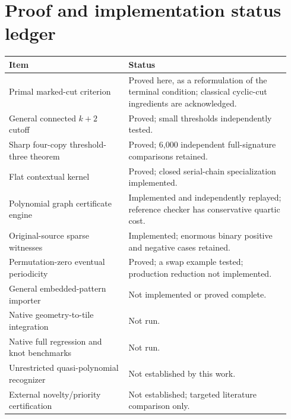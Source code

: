 \documentclass[11pt]{article}
\theoremstyle{remark}\newtheorem{remark}[theorem]{Remark}
\begin{document}
\section{Proof and implementation status ledger}
\begin{longtable}{>{\raggedright\arraybackslash}p{0.40\linewidth}>{\raggedright\arraybackslash}p{0.54\linewidth}}
\toprule
Item & Status\\\midrule\endhead
Primal marked-cut criterion & Proved here, as a reformulation of the terminal condition; classical cyclic-cut ingredients are acknowledged.\\
General connected $k+2$ cutoff & Proved; small thresholds independently tested.\\
Sharp four-copy threshold-three theorem & Proved; 6,000 independent full-signature comparisons retained.\\
Flat contextual kernel & Proved; closed serial-chain specialization implemented.\\
Polynomial graph certificate engine & Implemented and independently replayed; reference checker has conservative quartic cost.\\
Original-source sparse witnesses & Implemented; enormous binary positive and negative cases retained.\\
Permutation-zero eventual periodicity & Proved; a swap example tested; production reduction not implemented.\\
General embedded-pattern importer & Not implemented or proved complete.\\
Native geometry-to-tile integration & Not run.\\
Native full regression and knot benchmarks & Not run.\\
Unrestricted quasi-polynomial recognizer & Not established by this work.\\
External novelty/priority certification & Not established; targeted literature comparison only.\\
\bottomrule
\end{longtable}
\end{document}
